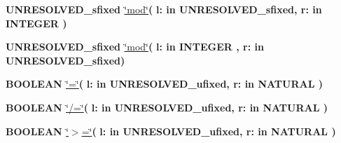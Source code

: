 \begin{DoxyCompactItemize}
\item 
{\bfseries {\bfseries \textcolor{vhdlchar}{U\+N\+R\+E\+S\+O\+L\+V\+E\+D\+\_\+sfixed}\textcolor{vhdlchar}{ }}} \hyperlink{class__fixed__pkg_a3ef5d5f2634d904601d29ae5c41d2f9e}{\char`\"{}mod\char`\"{}}{\bfseries  ( }{\bfseries \textcolor{vhdlchar}{l\+: }\textcolor{stringliteral}{in }\textcolor{vhdlchar}{U\+N\+R\+E\+S\+O\+L\+V\+E\+D\+\_\+sfixed}}{\bfseries  , \textcolor{vhdlchar}{r\+: }\textcolor{stringliteral}{in }{\bfseries \textcolor{comment}{I\+N\+T\+E\+G\+E\+R}\textcolor{vhdlchar}{ }}}{\bfseries  )} 
\item 
{\bfseries {\bfseries \textcolor{vhdlchar}{U\+N\+R\+E\+S\+O\+L\+V\+E\+D\+\_\+sfixed}\textcolor{vhdlchar}{ }}} \hyperlink{class__fixed__pkg_a3ef5d5f2634d904601d29ae5c41d2f9e}{\char`\"{}mod\char`\"{}}{\bfseries  ( }{\bfseries \textcolor{vhdlchar}{l\+: }\textcolor{stringliteral}{in }{\bfseries \textcolor{comment}{I\+N\+T\+E\+G\+E\+R}\textcolor{vhdlchar}{ }}}{\bfseries  , \textcolor{vhdlchar}{r\+: }\textcolor{stringliteral}{in }\textcolor{vhdlchar}{U\+N\+R\+E\+S\+O\+L\+V\+E\+D\+\_\+sfixed}}{\bfseries  )} 
\item 
{\bfseries {\bfseries \textcolor{comment}{B\+O\+O\+L\+E\+A\+N}\textcolor{vhdlchar}{ }}} \hyperlink{class__fixed__pkg_a7949e9258ea0749e3b35961feea8db87}{\char`\"{}=\char`\"{}}{\bfseries  ( }{\bfseries \textcolor{vhdlchar}{l\+: }\textcolor{stringliteral}{in }\textcolor{vhdlchar}{U\+N\+R\+E\+S\+O\+L\+V\+E\+D\+\_\+ufixed}}{\bfseries  , \textcolor{vhdlchar}{r\+: }\textcolor{stringliteral}{in }{\bfseries \textcolor{comment}{N\+A\+T\+U\+R\+A\+L}\textcolor{vhdlchar}{ }}}{\bfseries  )} 
\item 
{\bfseries {\bfseries \textcolor{comment}{B\+O\+O\+L\+E\+A\+N}\textcolor{vhdlchar}{ }}} \hyperlink{class__fixed__pkg_a00087aded97b434060226b9ba63a9077}{\char`\"{}/=\char`\"{}}{\bfseries  ( }{\bfseries \textcolor{vhdlchar}{l\+: }\textcolor{stringliteral}{in }\textcolor{vhdlchar}{U\+N\+R\+E\+S\+O\+L\+V\+E\+D\+\_\+ufixed}}{\bfseries  , \textcolor{vhdlchar}{r\+: }\textcolor{stringliteral}{in }{\bfseries \textcolor{comment}{N\+A\+T\+U\+R\+A\+L}\textcolor{vhdlchar}{ }}}{\bfseries  )} 
\item 
{\bfseries {\bfseries \textcolor{comment}{B\+O\+O\+L\+E\+A\+N}\textcolor{vhdlchar}{ }}} \hyperlink{class__fixed__pkg_a4cd07e388cdbb3996dd11f56781d3758}{\char`\"{}$>$=\char`\"{}}{\bfseries  ( }{\bfseries \textcolor{vhdlchar}{l\+: }\textcolor{stringliteral}{in }\textcolor{vhdlchar}{U\+N\+R\+E\+S\+O\+L\+V\+E\+D\+\_\+ufixed}}{\bfseries  , \textcolor{vhdlchar}{r\+: }\textcolor{stringliteral}{in }{\bfseries \textcolor{comment}{N\+A\+T\+U\+R\+A\+L}\textcolor{vhdlchar}{ }}}{\bfseries  )} 

\end{DoxyCompactItemize}
